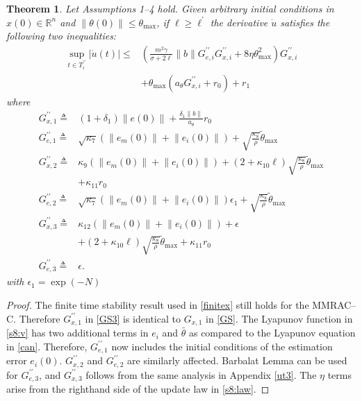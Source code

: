\documentclass[10pt,journal]{IEEEtran}
\theoremstyle{plain}%
\newtheorem{thm}{Theorem}%
\theoremstyle{definition}
\newcommand{\be}[0]{\begin{equation}}
\newcommand{\ee}[0]{\end{equation}}
\newcommand{\norms}[1]{\lVert#1\rVert}
\newcommand{\normB}[0]{\norms}
\let\norm=\normB
\newcommand{\abs}[1]{\left\lvert#1\right\rvert}
\renewcommand{\Re}[0]{\mathbb R}
\begin{document}
\begin{thm}\label{thmudot3}
Let Assumptions 1--4 hold. Given arbitrary initial conditions in $x(0)\in\Re^n$ and $\norm{\theta(0)}\leq \theta_\text{max}$, if $\ell\geq\ell^\prime$ the derivative $\dot u$ satisfies the following two inequalities:
\be
\begin{split}
 \sup_{t\in T_i^{\prime\prime}}\abs{\dot u(t)} \leq &\left(\frac{m^2\gamma}{\sigma+2\ell}\norm b G^{\prime\prime}_{e,i}G^{\prime\prime}_{x,i} +8\eta  \theta^2_\text{max}\right)G^{\prime\prime}_{x,i}   \\ & + \theta_\text{max}\left(a_\theta G^{\prime\prime}_{x,i}+r_0\right) + r_1\label{ub13}
\end{split}
\ee where
\be\label{GS3}\begin{split}
G^{\prime\prime}_{x,1}\triangleq & (1+\delta_1) \norm{e(0)} +\frac{\delta_1 \norm b }{a_\theta}r_0\\
G^{\prime\prime}_{e,1}\triangleq & \sqrt{\kappa_7}\left( \norm{e_m(0)} +\norm{e_i(0)}\right) + \sqrt{\frac{\kappa_8}{\rho}} {\tilde\theta_\text{max}} \\
G^{\prime\prime}_{x,2}\triangleq &\kappa_9 \left( \norm{e_m(0)} +\norm{e_i(0)}\right) +
\left(2+\kappa_{10} \ell \right) \sqrt{\frac{\kappa_8}{\rho}} {\tilde\theta_\text{max}} 
\\ &+\kappa_{11} r_0\\
G^{\prime\prime}_{e,2}\triangleq  & \sqrt{\kappa_7}\left( \norm{e_m(0)} +\norm{e_i(0)}\right) \epsilon_1 + \sqrt{\frac{\kappa_8}{\rho}} {\tilde\theta_\text{max}} \\
G^{\prime\prime}_{x,3}\triangleq &\kappa_{12} \left( \norm{e_m(0)} +\norm{e_i(0)}\right) +\epsilon\\& +
\left(2+\kappa_{10} \ell \right) \sqrt{\frac{\kappa_8}{\rho}} {\tilde\theta_\text{max}} +\kappa_{11} r_0\\
G^{\prime\prime}_{e,3}\triangleq &\epsilon.
\end{split}
\ee
with $\epsilon_1 = \exp(-N)$
\end{thm}
\begin{proof}
The finite time stability result used in \eqref{finitex} still holds for the MMRAC--C. Therefore $G^{\prime\prime}_{x,1}$ in \eqref{GS3} is identical to $G_{x,1}$ in  \eqref{GS}. The Lyapunov function in \eqref{s8:v} has two additional terms in $e_i$ and $\bar \theta$ as compared to the Lyapunov equation in \eqref{can}. Therefore, $G^{\prime\prime}_{e,1}$ now includes the initial conditions of the estimation error $e_i(0)$. $G^{\prime\prime}_{x,2}$ and $G^{\prime\prime}_{e,2}$ are similarly affected. Barbalat Lemma can be used for $G_{e,3}^{\prime\prime}$, and $G_{x,3}^{\prime\prime}$ follows from the same analysis in Appendix \ref{ut3}. The $\eta$ terms arise from the righthand side of the update law in \eqref{s8:law}.
\end{proof}
\end{document}
